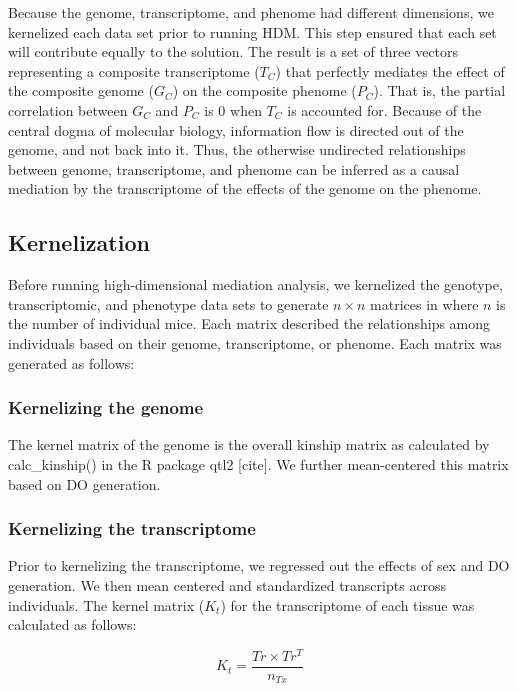 \documentclass[
]{article}
\begin{document}
Because the genome, transcriptome, and phenome had different dimensions,
we kernelized each data set prior to running HDM. This step ensured that
each set will contribute equally to the solution. The result is a set of
three vectors representing a composite transcriptome (\(T_C\)) that
perfectly mediates the effect of the composite genome (\(G_C\)) on the
composite phenome (\(P_C\)). That is, the partial correlation between
\(G_C\) and \(P_C\) is 0 when \(T_C\) is accounted for. Because of the
central dogma of molecular biology, information flow is directed out of
the genome, and not back into it. Thus, the otherwise undirected
relationships between genome, transcriptome, and phenome can be inferred
as a causal mediation by the transcriptome of the effects of the genome
on the phenome.

\subsection{Kernelization}\label{kernelization}

Before running high-dimensional mediation analysis, we kernelized the
genotype, transcriptomic, and phenotype data sets to generate
\(n \times n\) matrices in where \(n\) is the number of individual mice.
Each matrix described the relationships among individuals based on their
genome, transcriptome, or phenome. Each matrix was generated as follows:

\subsubsection{Kernelizing the genome}\label{kernelizing-the-genome}

The kernel matrix of the genome is the overall kinship matrix as
calculated by calc\_kinship() in the R package qtl2 {[}cite{]}. We
further mean-centered this matrix based on DO generation.

\subsubsection{Kernelizing the
transcriptome}\label{kernelizing-the-transcriptome}

Prior to kernelizing the transcriptome, we regressed out the effects of
sex and DO generation. We then mean centered and standardized
transcripts across individuals. The kernel matrix (\(K_t\)) for the
transcriptome of each tissue was calculated as follows:

\begin{equation*}
K_t = \frac{Tr \times Tr^T}{n_{Tx}}
\end{equation*}
\end{document}
